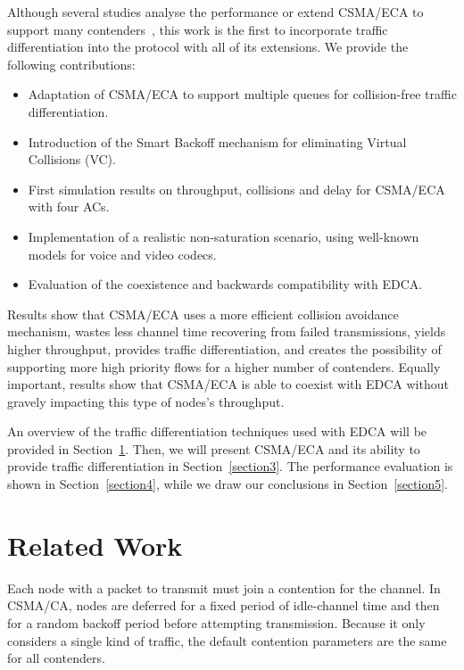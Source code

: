 \documentclass[a4paper]{article}
\begin{document}
Although several studies analyse the performance or extend CSMA/ECA to support many contenders~\cite{bellalta2009vtc,barcelo2011tcf,ECA-DEMO-INFOCOM14,research2standards,sanabria2014high}, this work is the first to incorporate traffic differentiation into the protocol with all of its extensions. We provide the following contributions:

\begin{itemize}
	\item Adaptation of CSMA/ECA to support multiple queues for collision-free traffic differentiation.
	\item Introduction of the Smart Backoff mechanism for eliminating Virtual Collisions (VC).
	\item First simulation results on throughput, collisions and delay for CSMA/ECA with four ACs.
	\item Implementation of a realistic non-saturation scenario, using well-known models for voice and video codecs.
	\item Evaluation of the coexistence and backwards compatibility with EDCA.
\end{itemize}

Results show that CSMA/ECA uses a more efficient collision avoidance mechanism, wastes less channel time recovering from failed transmissions, yields higher throughput, provides traffic differentiation, and creates the possibility of supporting more high priority flows for a higher number of contenders. Equally important, results show that CSMA/ECA is able to coexist with EDCA without gravely impacting this type of nodes's throughput.

An overview of the traffic differentiation techniques used with EDCA will be provided in Section~\ref{section2}. Then, we will present CSMA/ECA and its ability to provide traffic differentiation in Section~\ref{section3}. The performance evaluation is shown in Section~\ref{section4}, while we draw our conclusions in Section~\ref{section5}.

\section{Related Work}\label{section2}
Each node with a packet to transmit must join a contention for the channel. In CSMA/CA, nodes are deferred for a fixed period of idle-channel time and then for a random backoff period before attempting transmission. Because it only considers a single kind of traffic, the default contention parameters are the same for all contenders. 
\end{document}
